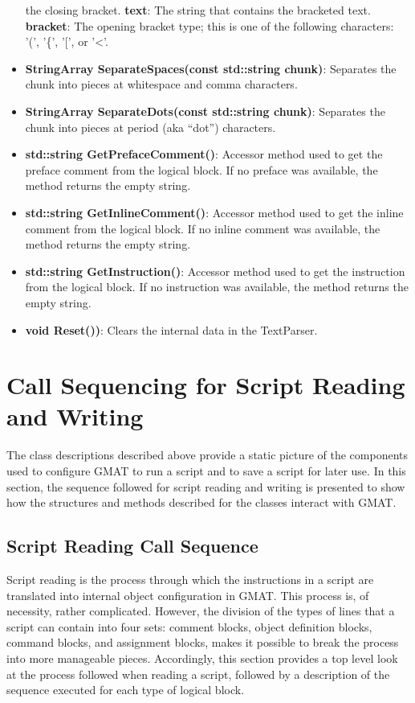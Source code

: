 \begin{itemize}
the closing bracket.
\subitem \textbf{text}: The string that contains the bracketed text.
\subitem \textbf{bracket}: The opening bracket type; this is one of the following characters: '(',
'\{', '[', or '<'.
\item \textbf{StringArray SeparateSpaces(const std::string chunk)}: Separates the chunk into pieces
at whitespace and comma characters.
\item \textbf{StringArray SeparateDots(const std::string chunk)}: Separates the chunk into pieces
at period (aka ``dot'') characters.
\item \textbf{std::string GetPrefaceComment()}: Accessor method used to get the preface comment
from the logical block.  If no preface was available, the method returns the empty string.
\item \textbf{std::string GetInlineComment()}: Accessor method used to get the inline comment
from the logical block.  If no inline comment was available, the method returns the empty string.
\item \textbf{std::string GetInstruction()}: Accessor method used to get the instruction
from the logical block.  If no instruction was available, the method returns the empty string.
\item\textbf{void Reset())}: Clears the internal data in the TextParser.
\end{itemize}

\section{\label{section:SIReadSequence}Call Sequencing for Script Reading and Writing}

The class descriptions described above provide a static picture of the components used to configure
GMAT to run a script and to save a script for later use.  In this section, the sequence followed
for script reading and writing is presented to show how the structures and methods described for
the classes interact with GMAT.

\subsection{Script Reading Call Sequence}

Script reading is the process through which the instructions in a script are translated into
internal object configuration in GMAT.  This process is, of necessity, rather complicated.
However, the division of the types of lines that a script can contain into four sets: comment
blocks, object definition blocks, command blocks, and assignment blocks, makes it possible to break
the process into more manageable pieces.  Accordingly, this section provides a top level look at
the process followed when reading a script, followed by a description of the sequence executed for
each type of logical block.

